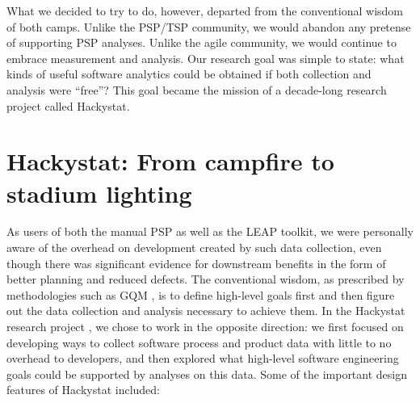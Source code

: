 \documentclass[]{article}
\begin{document}
What we decided to try to do, however, departed from the conventional wisdom of both
camps. Unlike the PSP/TSP community, we would abandon any pretense of supporting PSP
analyses.  Unlike the agile community, we would continue to embrace measurement and
analysis.  Our research goal was simple to state: what kinds of useful software analytics
could be obtained if both collection and analysis were ``free''?  This goal became the
mission of a decade-long research project called Hackystat. 

\section{Hackystat:  From campfire to stadium lighting}

As users of both the manual PSP as well as the LEAP toolkit, we were personally aware of
the overhead on development created by such data collection, even though there was
significant evidence for downstream benefits in the form of better planning and reduced
defects. The conventional wisdom, as prescribed by methodologies such as GQM
\cite{Basili94gqm}, is to define high-level goals first and then figure out the data
collection and analysis necessary to achieve them.  In the Hackystat research project
\cite{csdl2-02-07}, we chose to work in the opposite direction: we first focused on
developing ways to collect software process and product data with little to no overhead to
developers, and then explored what high-level software engineering goals could be
supported by analyses on this data. Some of the important design features of Hackystat included:
\end{document}
